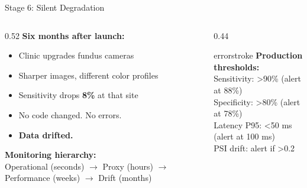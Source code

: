 \documentclass[aspectratio=169, 12pt]{beamer}
\begin{document}
\begin{frame}{Stage 6: Silent Degradation}
\note{
%
%
%
%
}

\footnotesize
\begin{columns}[T]
  \begin{column}{0.52\textwidth}
    \textbf{Six months after launch:}
    \begin{itemize}\setlength\itemsep{0pt}
      \item Clinic upgrades fundus cameras
      \item Sharper images, different color profiles
      \item Sensitivity drops \textbf{8\%} at that site
      \item No code changed. No errors.
      \item \textcolor{errorstroke}{\textbf{Data drifted.}}
    \end{itemize}

    \vspace{0.05cm}
    \textbf{Monitoring hierarchy:}\\
    {\scriptsize
    Operational (seconds) $\to$ Proxy (hours) $\to$ Performance (weeks) $\to$ Drift (months)}
  \end{column}
  \begin{column}{0.44\textwidth}
    \begin{mlsyscard}{errorstroke}
    {\scriptsize \textbf{Production thresholds:}\\
    Sensitivity: >90\% (alert at 88\%)\\
    Specificity: >80\% (alert at 78\%)\\
    Latency P95: <50 ms (alert at 100 ms)\\
    PSI drift: alert if >0.2}
    \end{mlsyscard}


\end{column}
\end{columns}
\end{frame}
\end{document}

